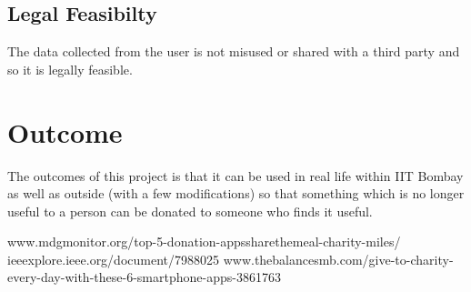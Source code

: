 \documentclass[12pt, a4paper]{article}
\begin{document}
\subsection{Legal Feasibilty}
The data collected from the user is not misused or shared with a third party and so it is legally feasible.

\section{Outcome}
The outcomes of this project is that it can be used in real life within IIT Bombay as well as outside (with a few modifications) so that something which is no longer useful to a person can be donated to someone who finds it useful.

\begin{thebibliography}{9}
 www.mdgmonitor.org/top-5-donation-appssharethemeal-charity-miles/
 ieeexplore.ieee.org/document/7988025
 www.thebalancesmb.com/give-to-charity-every-day-with-these-6-smartphone-apps-3861763
\end{thebibliography}
\end{document}

